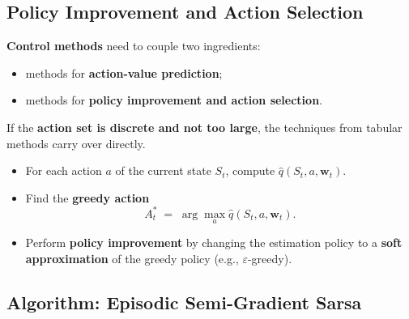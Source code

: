 \documentclass[11pt,a4paper]{article}
\theoremstyle{definition}
\theoremstyle{plain}
\theoremstyle{remark}
\begin{document}
\subsection{Policy Improvement and Action Selection}

\textbf{Control methods} need to couple two ingredients:
\begin{itemize}
    \item methods for \textbf{action-value prediction};
    \item methods for \textbf{policy improvement and action selection}.
\end{itemize}

If the \textbf{action set is discrete and not too large}, the techniques from tabular methods carry over directly.

\begin{tcolorbox}[colback=blue!5!white, colframe=blue!60!black, title={Idea: Greedy Action Selection with Approximation}]
\begin{itemize}
    \item For each action $a$ of the current state $S_t$, compute $\hat{q}(S_t, a, \mathbf{w}_t)$.
    \item Find the \textbf{greedy action}
    \[
        A_t^* \;=\; \arg\max_{a} \hat{q}(S_t, a, \mathbf{w}_t).
    \]
    \item Perform \textbf{policy improvement} by changing the estimation policy to a \textbf{soft approximation} of the greedy policy (e.g., $\varepsilon$-greedy).
\end{itemize}
\end{tcolorbox}

\subsection{Algorithm: Episodic Semi-Gradient Sarsa}
\end{document}
